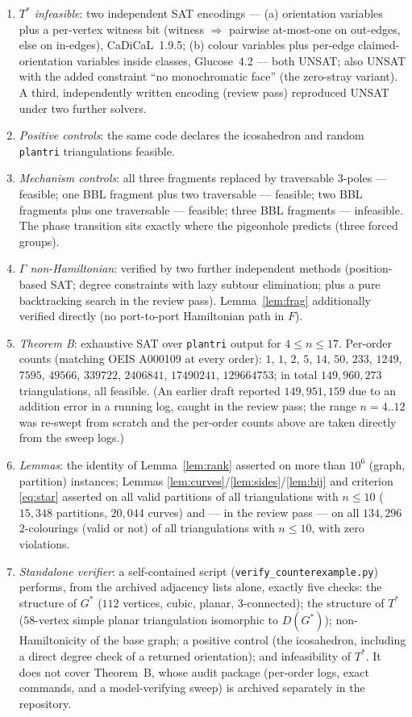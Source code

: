 \documentclass[11pt]{article}
\theoremstyle{remark}
\begin{document}
\begin{enumerate}
\item \emph{$T^{*}$ infeasible}: two independent SAT encodings --- (a)
orientation variables plus a per-vertex witness bit (witness $\Rightarrow$
pairwise at-most-one on out-edges, else on in-edges), CaDiCaL~1.9.5;
(b) colour variables plus per-edge claimed-orientation variables inside
classes, Glucose~4.2 --- both UNSAT; also UNSAT with the added
constraint ``no monochromatic face'' (the zero-stray variant). A third,
independently written encoding (review pass) reproduced UNSAT under two
further solvers.
\item \emph{Positive controls}: the same code declares the icosahedron
and random \texttt{plantri} triangulations feasible.
\item \emph{Mechanism controls}: all three fragments replaced by
traversable $3$-poles --- feasible; one BBL fragment plus two
traversable --- feasible; two BBL fragments plus one traversable ---
feasible; three BBL fragments --- infeasible. The phase transition sits
exactly where the pigeonhole predicts (three forced groups).
\item \emph{$\Gamma$ non-Hamiltonian}: verified by two further
independent methods (position-based SAT; degree constraints with lazy
subtour elimination; plus a pure backtracking search in the review
pass). Lemma~\ref{lem:frag} additionally verified directly (no
port-to-port Hamiltonian path in $F$).
\item \emph{Theorem B}: exhaustive SAT over \texttt{plantri} output for
$4\le n\le 17$. Per-order counts (matching OEIS A000109 at every
order): $1$, $1$, $2$, $5$, $14$, $50$, $233$, $1249$, $7595$, $49566$,
$339722$, $2406841$, $17490241$, $129664753$; in total $149{,}960{,}273$
triangulations, all feasible. (An earlier draft reported
$149{,}951{,}159$ due to an addition error in a running log, caught in
the review pass; the range $n=4..12$ was re-swept from scratch and the
per-order counts above are taken directly from the sweep logs.)
\item \emph{Lemmas}: the identity of Lemma~\ref{lem:rank} asserted on
more than $10^6$ (graph, partition) instances; Lemmas
\ref{lem:curves}/\ref{lem:sides}/\ref{lem:bij} and criterion
\eqref{eq:star} asserted on all valid partitions of all triangulations
with $n\le 10$ ($15{,}348$ partitions, $20{,}044$ curves) and --- in the
review pass --- on all $134{,}296$ $2$-colourings (valid or not) of all
triangulations with $n\le 10$, with zero violations.
\item \emph{Standalone verifier}: a self-contained script
(\texttt{verify\_counterexample.py}) performs, from the archived
adjacency lists alone, exactly five checks: the structure of $G^{*}$
($112$ vertices, cubic, planar, $3$-connected); the structure of
$T^{*}$ ($58$-vertex simple planar triangulation isomorphic to
$D(G^{*})$); non-Hamiltonicity of the base graph; a positive control
(the icosahedron, including a direct degree check of a returned
orientation); and infeasibility of $T^{*}$. It does not cover
Theorem~B, whose audit package (per-order logs, exact commands, and a
model-verifying sweep) is archived separately in the repository.
\end{enumerate}
\end{document}
